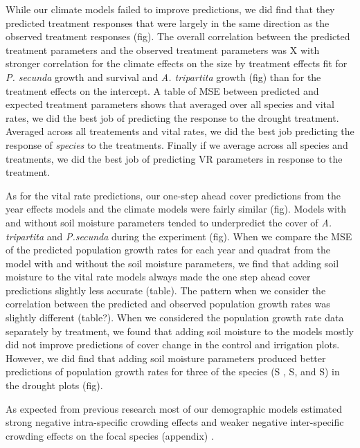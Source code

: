 \documentclass[11pt]{article}
\begin{document}
\begin{doublespacing}
While our climate models failed to improve predictions, we did find that they predicted treatment responses that were largely in the same direction as the observed treatment responses (fig).  The overall correlation between the predicted treatment parameters and the observed treatment parameters was X with stronger correlation for the climate effects on the size by treatment effects fit for \textit{P. secunda} growth and survival and \textit{A. tripartita} growth (fig) than for the treatment effects on the intercept.  A table of MSE between predicted and expected treatment parameters shows that averaged over all species and vital rates, we did the best job of predicting the response to the drought treatment.  Averaged across all treatements and vital rates, we did the best job predicting the response of \textit{species} to the treatments. Finally if we average across all species and treatments, we did the best job of predicting VR parameters in response to the treatment. 

As for the vital rate predictions, our one-step ahead cover predictions from the year effects models and the climate models were fairly similar (fig). Models with and without soil moisture parameters tended to underpredict the cover of \textit{A. tripartita} and \textit{P.secunda} during the experiment (fig).  When we compare the MSE of the predicted population growth rates for each year and quadrat from the model with and without the soil moisture parameters, we find that adding soil moisture to the vital rate models always made the one step ahead cover predictions slightly less accurate (table).  The pattern when we consider the correlation between the predicted and observed population growth rates was slightly different (table?).  When we considered the population growth rate data separately by treatment, we found that adding soil moisture to the models mostly did not improve predictions of cover change in the control and irrigation plots. However, we did find that adding soil moisture parameters produced better predictions of population growth rates for three of the species (S , S, and S) in the drought plots (fig). 
  
As expected from previous research most of our demographic models estimated strong negative intra-specific crowding effects and weaker negative inter-specific crowding effects on the focal species (appendix) \citep{adler_coexistence_2010,chu_direct_2016,chu_large_2015}.
 

\end{doublespacing}
\end{document}
